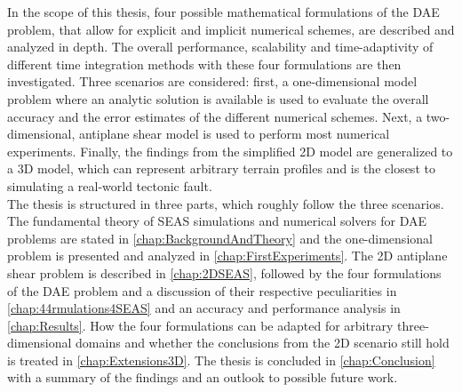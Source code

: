 In the scope of this thesis, four possible mathematical formulations of the DAE problem, that allow for explicit and implicit numerical schemes, are described and analyzed in depth. The overall performance, scalability and time-adaptivity of different time integration methods with these four formulations are then investigated. Three scenarios are considered: first, a one-dimensional model problem where an analytic solution is available is used to evaluate the overall accuracy and the error estimates of the different numerical schemes. Next, a two-dimensional, antiplane shear model is used to perform most numerical experiments. Finally, the findings from the simplified 2D model are generalized to a 3D model, which can represent arbitrary terrain profiles and is the closest to simulating a real-world tectonic fault. \\
The thesis is structured in three parts, which roughly follow the three scenarios. The fundamental theory of SEAS simulations and numerical solvers for DAE problems are stated in \autoref{chap:BackgroundAndTheory} and the one-dimensional problem is presented and analyzed in \autoref{chap:FirstExperiments}. The 2D antiplane shear problem is described in \autoref{chap:2DSEAS}, followed by the four formulations of the DAE problem and a discussion of their respective peculiarities in \autoref{chap:44rmulations4SEAS} and an accuracy and performance analysis in \autoref{chap:Results}. How the four formulations can be adapted for arbitrary three-dimensional domains and whether the conclusions from the 2D scenario still hold is treated in \autoref{chap:Extensions3D}. The thesis is concluded in \autoref{chap:Conclusion} with a summary of the findings and an outlook to possible future work.


